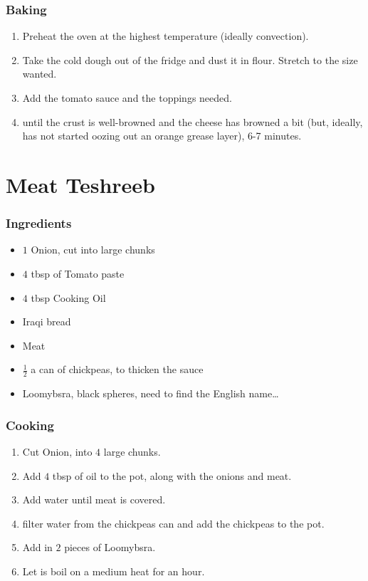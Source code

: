 \subsubsection{Baking}
\begin{enumerate}
    \item Preheat the oven at the highest temperature (ideally convection).
    \item Take the cold dough out of the fridge and dust it in flour. Stretch to the size wanted.
    \item Add the tomato sauce and the toppings needed.
    \item until the crust is well-browned and the cheese has browned a bit (but, ideally, has not started oozing out an orange grease layer), 6-7 minutes.
\end{enumerate}

\section{Meat Teshreeb}
\subsubsection{Ingredients}
\begin{itemize}
    \item $1$ Onion, cut into large chunks
    \item $4$ tbsp of Tomato paste
    \item $4$ tbsp Cooking Oil
    \item Iraqi bread
    \item Meat
    \item $\frac{1}{2}$ a can of chickpeas, to thicken the sauce
    \item Loomybsra, black spheres, need to find the English name\ldots
\end{itemize}

\subsubsection{Cooking}
\begin{enumerate}
    \item Cut Onion, into $4$ large chunks.
    \item Add $4$ tbsp of oil to the pot, along with the onions and meat.
    \item Add water until meat is covered.
    \item filter water from the chickpeas can and add the chickpeas to the pot.
    \item Add in $2$ pieces of Loomybsra.
    \item Let is boil on a medium heat for an hour.
\end{enumerate}
